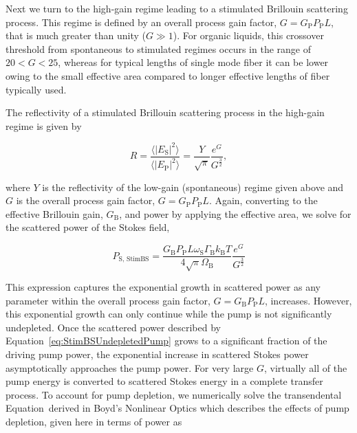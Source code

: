 Next we turn to the high-gain regime leading to a stimulated Brillouin scattering process. This regime is defined by an overall process gain factor, \(G = G_{\mathrm{P}}P_{\mathrm{P}}L\), that is much greater than unity (\(G \gg 1\)). For organic liquids, this crossover threshold from spontaneous to stimulated regimes occurs in the range of \(20 < G < 25\), \cite{boyd1990noise} whereas for typical lengths of single mode fiber it can be lower \cite{ippen1972stimulated} owing to the small effective area compared to longer effective lengths of fiber typically used.

The reflectivity of a stimulated Brillouin scattering process in the high-gain regime is given by \cite{boyd1990noise}

\begin{equation}
  R = \frac{\langle|E_{\mathrm{S}}|^{2}\rangle}{\langle|E_{\mathrm{P}}|^{2}\rangle} = \frac{Y}{\sqrt{\pi}}\frac{e^{G}}{G^{\frac{3}{2}}},
\end{equation}

where \(Y\) is the reflectivity of the low-gain (spontaneous) regime given above and \(G\) is the overall process gain factor, \(G = G_{\mathrm{P}}P_{\mathrm{P}}L\). Again, converting to the effective Brillouin gain, \(G_{\mathrm{B}}\), and power by applying the effective area, we solve for the scattered power of the Stokes field,

\begin{equation}
  P_{\mathrm{S,\,StimBS}} = \frac{G_{\mathrm{B}}P_{\mathrm{P}}L\omega_{\mathrm{S}}\Gamma_{\mathrm{B}}k_{\mathrm{B}}T}{4\sqrt{\pi}\Omega_{\mathrm{B}}}\frac{e^{G}}{G^{\frac{3}{2}}}
  \label{eq:StimBSUndepletedPump}
\end{equation}

This expression captures the exponential growth in scattered power as any parameter within the overall process gain factor, \(G = G_{\mathrm{B}}P_{\mathrm{P}}L\), increases. However, this exponential growth can only continue while the pump is not significantly undepleted. Once the scattered power described by Equation~\ref{eq:StimBSUndepletedPump} grows to a significant fraction of the driving pump power, the exponential increase in scattered Stokes power asymptotically approaches the pump power. For very large \(G\), virtually all of the pump energy is converted to scattered Stokes energy in a complete transfer process.\cite{boyd2020nonlinear} To account for pump depletion, we numerically solve the transendental Equation~derived in Boyd's Nonlinear Optics which describes the effects of pump depletion, given here in terms of power as

